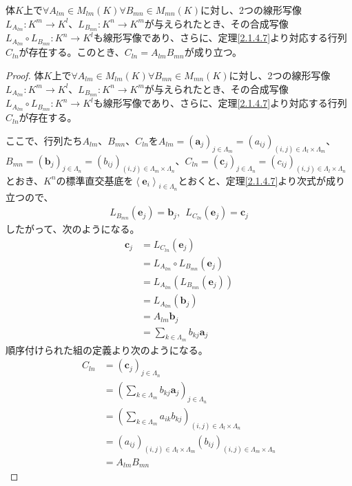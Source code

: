 \documentclass[dvipdfmx]{jsarticle}
\begin{document}
\begin{thm}\label{2.1.4.8}
体$K$上で$\forall A_{lm} \in M_{lm}(K)\forall B_{mn} \in M_{mn}(K)$に対し、2つの線形写像$L_{A_{lm}}:K^{m} \rightarrow K^{l}$、$L_{B_{mn}}:K^{n} \rightarrow K^{m}$が与えられたとき、その合成写像$L_{A_{lm}} \circ L_{B_{mn}}:K^{n} \rightarrow K^{l}$も線形写像であり、さらに、定理\ref{2.1.4.7}より対応する行列$C_{ln}$が存在する。このとき、$C_{ln} = A_{lm}B_{mn}$が成り立つ。
\end{thm}
\begin{proof}
体$K$上で$\forall A_{lm} \in M_{lm}(K)\forall B_{mn} \in M_{mn}(K)$に対し、2つの線形写像$L_{A_{lm}}:K^{m} \rightarrow K^{l}$、$L_{B_{mn}}:K^{n} \rightarrow K^{m}$が与えられたとき、その合成写像$L_{A_{lm}} \circ L_{B_{mn}}:K^{n} \rightarrow K^{l}$も線形写像であり、さらに、定理\ref{2.1.4.7}より対応する行列$C_{ln}$が存在する。\par
ここで、行列たち$A_{lm}$、$B_{mn}$、$C_{ln}$を$A_{lm} = \left( \mathbf{a}_{j} \right)_{j \in \varLambda_{m}} = \left( a_{ij} \right)_{(i,j) \in \varLambda_{l} \times \varLambda_{m}}$、$B_{mn} = \left( \mathbf{b}_{j} \right)_{j \in \varLambda_{n}} = \left( b_{ij} \right)_{(i,j) \in \varLambda_{m} \times \varLambda_{n}}$、$C_{ln} = \left( \mathbf{c}_{j} \right)_{j \in \varLambda_{n}} = \left( c_{ij} \right)_{(i,j) \in \varLambda_{l} \times \varLambda_{n}}$とおき、$K^{n}$の標準直交基底を$\left\langle \mathbf{e}_{i} \right\rangle_{i \in \varLambda_{n}}$とおくと、定理\ref{2.1.4.7}より次式が成り立つので、
\begin{align*}
L_{B_{mn}}\left( \mathbf{e}_{j} \right) = \mathbf{b}_{j},\ \ L_{C_{ln}}\left( \mathbf{e}_{j} \right) = \mathbf{c}_{j}
\end{align*}
したがって、次のようになる。
\begin{align*}
\mathbf{c}_{j} &= L_{C_{ln}}\left( \mathbf{e}_{j} \right)\\
&= L_{A_{lm}} \circ L_{B_{mn}}\left( \mathbf{e}_{j} \right)\\
&= L_{A_{lm}}\left( L_{B_{mn}}\left( \mathbf{e}_{j} \right) \right)\\
&= L_{A_{lm}}\left( \mathbf{b}_{j} \right)\\
&= A_{lm}\mathbf{b}_{j}\\
&= \sum_{k \in \varLambda_{m}} {b_{kj}\mathbf{a}_{j}}
\end{align*}
順序付けられた組の定義より次のようになる。
\begin{align*}
C_{ln} &= \left( \mathbf{c}_{j} \right)_{j \in \varLambda_{n}}\\
&= \left( \sum_{k \in \varLambda_{m}} {b_{kj}\mathbf{a}_{j}} \right)_{j \in \varLambda_{n}}\\
&= \left( \sum_{k \in \varLambda_{m}} {a_{ik}b_{kj}} \right)_{(i,j) \in \varLambda_{l} \times \varLambda_{n}}\\
&= \left( a_{ij} \right)_{(i,j) \in \varLambda_{l} \times \varLambda_{m}}\left( b_{ij} \right)_{(i,j) \in \varLambda_{m} \times \varLambda_{n}}\\
&= A_{lm}B_{mn}
\end{align*}
\end{proof}
\end{document}
